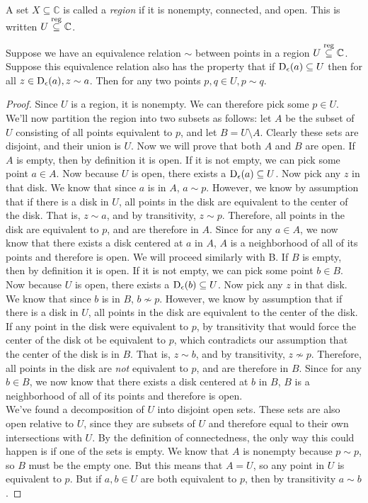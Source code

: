 \begin{definition}[Region]
A set $X \subseteq \mathbb{C}$ is called a \emph{region} if it is nonempty, connected, and open. This is written ${U}\overset{\text{reg}}{\subseteq}\mathbb{C}$.
\end{definition}
\begin{theorem}
Suppose we have an equivalence relation $\sim$ between points in a region ${U}\overset{\text{reg}}{\subseteq}\mathbb{C}$. Suppose this equivalence relation also has the property that if $\operatorname{D_{\epsilon}} ({a}) \subseteq U$ then for all $z \in \operatorname{D_{\epsilon}} ({a}), z\sim a$. Then for any two points $p,q \in U, p\sim q$.
\end{theorem}
\begin{proof}
Since $U$ is a region, it is nonempty. We can therefore pick some $p \in U$. We'll now partition the region into two subsets as follows: let $A$ be the subset of $U$ consisting of all points equivalent to $p$, and let $B = U \setminus A$. Clearly these sets are disjoint, and their union is $U$. Now we will prove that both $A$ and $B$ are open.
If $A$ is empty, then by definition it is open. If it is not empty, we can pick some point $a \in A$. Now because $U$ is open, there exists a $\operatorname{D_{\epsilon}} ({a}) \subseteq U$. Now pick any $z$ in that disk. We know that since $a$ is in $A$, $a \sim p$. However, we know by assumption that if there is a disk in $U$, all points in the disk are equivalent to the center of the disk. That is, $z \sim a$, and by transitivity, $z \sim p$. Therefore, all points in the disk are equivalent to $p$, and are therefore in $A$. Since for any $a \in A$, we now know that there exists a disk centered at $a$ in $A$, $A$ is a neighborhood of all of its points and therefore is open.
We will proceed similarly with B. If $B$ is empty, then by definition it is open. If it is not empty, we can pick some point $b \in B$. Now because $U$ is open, there exists a $\operatorname{D_{\epsilon}} ({b}) \subseteq U$. Now pick any $z$ in that disk. We know that since $b$ is in $B$, $b \not\sim p$. However, we know by assumption that if there is a disk in $U$, all points in the disk are equivalent to the center of the disk. If any point in the disk were equivalent to $p$, by transitivity that would force the center of the disk ot be equivalent to $p$, which contradicts our assumption that the center of the disk is in $B$. That is, $z \sim b$, and by transitivity, $z \not\sim p$. Therefore, all points in the disk are \emph{not} equivalent to $p$, and are therefore in $B$. Since for any $b \in B$, we now know that there exists a disk centered at $b$ in $B$, $B$ is a neighborhood of all of its points and therefore is open.\\
We've found a decomposition of $U$ into disjoint open sets. These sets are also open relative to $U$, since they are subsets of $U$ and therefore equal to their own intersections with $U$. By the definition of connectedness, the only way this could happen is if one of the sets is empty. We know that $A$ is nonempty because $p \sim p$, so $B$ must be the empty one. But this means that $A=U$, so any point in $U$ is equivalent to $p$. But if $a,b \in U$ are both equivalent to $p$, then by transitivity $a \sim b$.
\end{proof}
